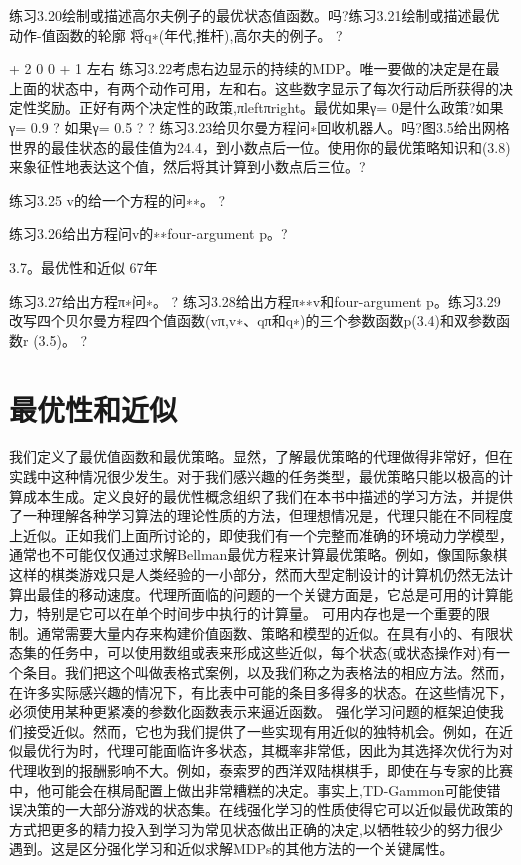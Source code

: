 练习3.20绘制或描述高尔夫例子的最优状态值函数。吗?练习3.21绘制或描述最优动作-值函数的轮廓
将q∗(年代,推杆),高尔夫的例子。 					?

+ 2 0 0 + 1
左右
练习3.22考虑右边显示的持续的MDP。唯一要做的决定是在最上面的状态中，有两个动作可用，左和右。这些数字显示了每次行动后所获得的决定性奖励。正好有两个决定性的政策,πleftπright。最优如果γ= 0是什么政策?如果γ= 0.9 ?
如果γ= 0.5 ? 					?
练习3.23给贝尔曼方程问∗回收机器人。吗?图3.5给出网格世界的最佳状态的最佳值为24.4，到小数点后一位。使用你的最优策略知识和(3.8)来象征性地表达这个值，然后将其计算到小数点后三位。?

练习3.25 v的给一个方程的问∗∗。 					?

练习3.26给出方程问v的∗∗four-argument p。?

3.7。最优性和近似 					67年

练习3.27给出方程π∗问∗。 					?
练习3.28给出方程π∗∗v和four-argument p。练习3.29改写四个贝尔曼方程四个值函数(vπ,v∗、qπ和q∗)的三个参数函数p(3.4)和双参数函数r
(3.5)。 					?



\section{最优性和近似}

我们定义了最优值函数和最优策略。显然，了解最优策略的代理做得非常好，但在实践中这种情况很少发生。对于我们感兴趣的任务类型，最优策略只能以极高的计算成本生成。定义良好的最优性概念组织了我们在本书中描述的学习方法，并提供了一种理解各种学习算法的理论性质的方法，但理想情况是，代理只能在不同程度上近似。正如我们上面所讨论的，即使我们有一个完整而准确的环境动力学模型，通常也不可能仅仅通过求解Bellman最优方程来计算最优策略。例如，像国际象棋这样的棋类游戏只是人类经验的一小部分，然而大型定制设计的计算机仍然无法计算出最佳的移动速度。代理所面临的问题的一个关键方面是，它总是可用的计算能力，特别是它可以在单个时间步中执行的计算量。
可用内存也是一个重要的限制。通常需要大量内存来构建价值函数、策略和模型的近似。在具有小的、有限状态集的任务中，可以使用数组或表来形成这些近似，每个状态(或状态操作对)有一个条目。我们把这个叫做表格式案例，以及我们称之为表格法的相应方法。然而，在许多实际感兴趣的情况下，有比表中可能的条目多得多的状态。在这些情况下，必须使用某种更紧凑的参数化函数表示来逼近函数。
强化学习问题的框架迫使我们接受近似。然而，它也为我们提供了一些实现有用近似的独特机会。例如，在近似最优行为时，代理可能面临许多状态，其概率非常低，因此为其选择次优行为对代理收到的报酬影响不大。例如，泰索罗的西洋双陆棋棋手，即使在与专家的比赛中，他可能会在棋局配置上做出非常糟糕的决定。事实上,TD-Gammon可能使错误决策的一大部分游戏的状态集。在线强化学习的性质使得它可以近似最优政策的方式把更多的精力投入到学习为常见状态做出正确的决定,以牺牲较少的努力很少遇到。这是区分强化学习和近似求解MDPs的其他方法的一个关键属性。

